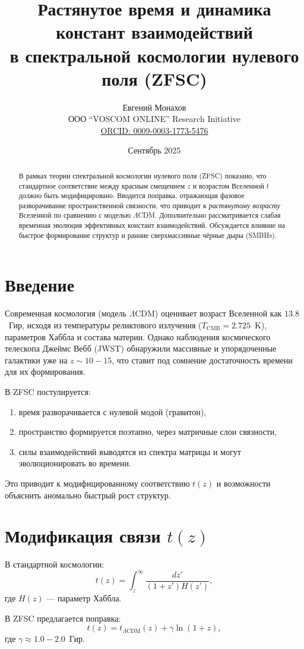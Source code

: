 \documentclass[12pt,a4paper]{article}
\title{Растянутое время и динамика констант взаимодействий \\
в спектральной космологии нулевого поля (ZFSC)}
\author{Евгений Монахов \\ ООО ``VOSCOM ONLINE'' Research Initiative \\ 
\href{https://orcid.org/0009-0003-1773-5476}{ORCID: 0009-0003-1773-5476}}
\date{Сентябрь 2025}
\begin{document}
\maketitle

\begin{abstract}
В рамках теории спектральной космологии нулевого поля (ZFSC) показано, что стандартное соответствие между красным смещением $z$ и возрастом Вселенной $t$ должно быть модифицировано. Вводится поправка, отражающая фазовое разворачивание пространственной связности, что приводит к \emph{растянутому возрасту} Вселенной по сравнению с моделью $\Lambda$CDM. Дополнительно рассматривается слабая временная эволюция эффективных констант взаимодействий. Обсуждается влияние на быстрое формирование структур и ранние сверхмассивные чёрные дыры (SMBHs).
\end{abstract}

\section{Введение}
Современная космология (модель $\Lambda$CDM) оценивает возраст Вселенной как $13.8$~Гир, исходя из температуры реликтового излучения ($T_{\text{CMB}}=2.725$~K), параметров Хаббла и состава материи. Однако наблюдения космического телескопа Джеймс Вебб (JWST) обнаружили массивные и упорядоченные галактики уже на $z\sim 10-15$, что ставит под сомнение достаточность времени для их формирования.

В ZFSC постулируется: 
\begin{enumerate}
  \item время разворачивается с нулевой модой (гравитон),
  \item пространство формируется поэтапно, через матричные слои связности,
  \item силы взаимодействий выводятся из спектра матрицы и могут эволюционировать во времени.
\end{enumerate}

Это приводит к модифицированному соответствию $t(z)$ и возможности объяснить аномально быстрый рост структур.

\section{Модификация связи $t(z)$}
В стандартной космологии:
\[
t(z) = \int_z^\infty \frac{dz'}{(1+z')H(z')},
\]
где $H(z)$ — параметр Хаббла. 

В ZFSC предлагается поправка:
\[
t(z) = t_{\Lambda\text{CDM}}(z) + \gamma \ln(1+z),
\]
где $\gamma \approx 1.0-2.0$~Гир. 
\end{document}

